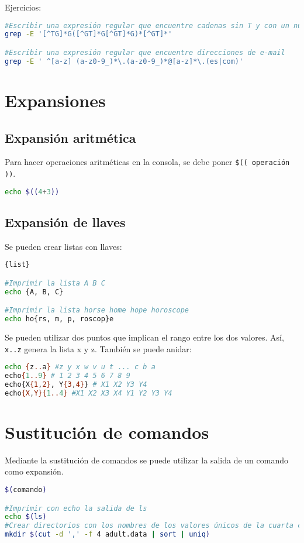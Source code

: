 Ejercicios: 
\begin{lstlisting}[language=bash]
#Escribir una expresión regular que encuentre cadenas sin T y con un número impar de G
grep -E '[^TG]*G([^GT]*G[^GT]*G)*[^GT]*'

#Escribir una expresión regular que encuentre direcciones de e-mail
grep -E ' ^[a-z] (a-z0-9_)*\.(a-z0-9_)*@[a-z]*\.(es|com)'
\end{lstlisting}

\section{Expansiones}
\subsection{Expansión aritmética}
Para hacer operaciones aritméticas en la consola, se debe poner \texttt{\$(( operación ))}. 
\begin{lstlisting}[language=bash]
echo $((4+3))
\end{lstlisting}

\subsection{Expansión de llaves}
Se pueden crear listas con llaves:
\begin{lstlisting}[language=bash]
{list}

#Imprimir la lista A B C
echo {A, B, C}

#Imprimir la lista horse home hope horoscope
echo ho{rs, m, p, roscop}e
\end{lstlisting}

Se pueden utilizar dos puntos que implican el rango entre los dos valores. Así, \texttt{{x..z}} genera la lista x y z. También se puede anidar:
\begin{lstlisting}[language=bash]
echo {z..a} #z y x w v u t ... c b a
echo{1..9} # 1 2 3 4 5 6 7 8 9
echo{X{1,2}, Y{3,4}} # X1 X2 Y3 Y4
echo{X,Y}{1..4} #X1 X2 X3 X4 Y1 Y2 Y3 Y4
\end{lstlisting}

\section{Sustitución de comandos}
Mediante la sustitución de comandos se puede utilizar la salida de un comando como expansión.
\begin{lstlisting}[language=bash]
$(comando)

#Imprimir con echo la salida de ls
echo $(ls)
#Crear directorios con los nombres de los valores únicos de la cuarta columna de adult.data
mkdir $(cut -d ',' -f 4 adult.data | sort | uniq)
\end{lstlisting}

